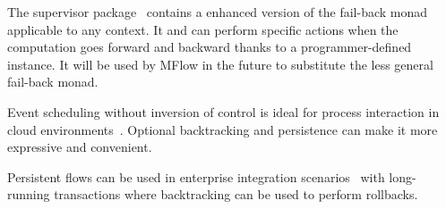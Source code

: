 \documentclass{tmr}
\begin{document}
The supervisor package~\cite{auth:supervisor} contains a enhanced version of the fail-back monad applicable to any context. It  and can perform specific actions when the computation goes forward and backward thanks to a programmer-defined instance. It will  be used by MFlow in the future to substitute the less general fail-back monad.


Event scheduling without inversion of control is ideal for process interaction in cloud environments~\cite{auth:scalacloud}. Optional backtracking and persistence can make it more expressive and convenient.  
  
Persistent flows can be used in enterprise integration scenarios~\cite{auth:integration} with long-running transactions where backtracking can be used to perform rollbacks.
  
  
  
  
\end{document}
